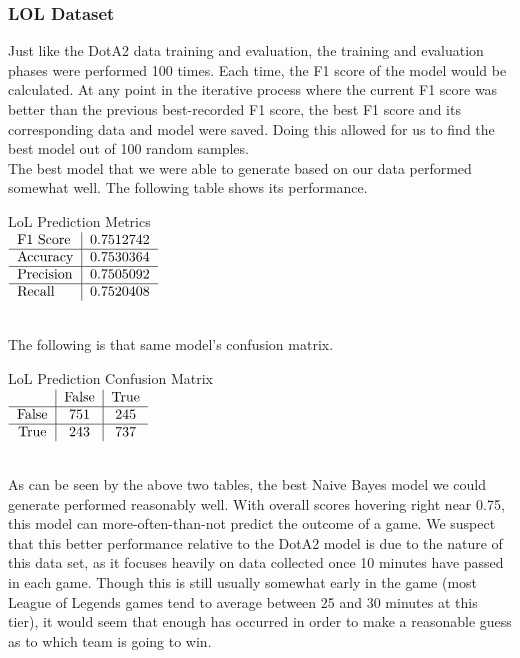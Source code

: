\documentclass[a4paper,fleqn]{cas-sc}
\begin{document}
\subsubsection{LOL Dataset}
 Just like the DotA2 data training and evaluation, the training and evaluation phases were performed 100 times. Each time, the F1 score of the model would be calculated. At any point in the iterative process where the current F1 score was better than the previous best-recorded F1 score, the best F1 score and its corresponding data and model were saved. Doing this allowed for us to find the best model out of 100 random samples.\\
The best model that we were able to generate based on our data performed somewhat well. The following table shows its performance.\\
\begin{center}
LoL Prediction Metrics\\
$\begin{tabular}{l|l}
F1 Score & 0.7512742 \\ \hline
Accuracy & 0.7530364 \\ \hline
Precision & 0.7505092 \\ \hline
Recall & 0.7520408 \\
\end{tabular}$
\end{center}\\
The following is that same model's confusion matrix.\\
\begin{center}
LoL Prediction Confusion Matrix\\
$\begin{tabular}{c|c|c}
 & False & True \\ \hline
False & 751 & 245 \\ \hline
True & 243 & 737 \\
\end{tabular}$
\end{center}\\
As can be seen by the above two tables, the best Naive Bayes model we could generate performed reasonably well. With overall scores hovering right near 0.75, this model can more-often-than-not predict the outcome of a game. We suspect that this better performance relative to the DotA2 model is due to the nature of this data set, as it focuses heavily on data collected once 10 minutes have passed in each game. Though this is still usually somewhat early in the game (most League of Legends games tend to average between 25 and 30 minutes at this tier), it would seem that enough has occurred in order to make a reasonable guess as to which team is going to win.\\
\end{document}
